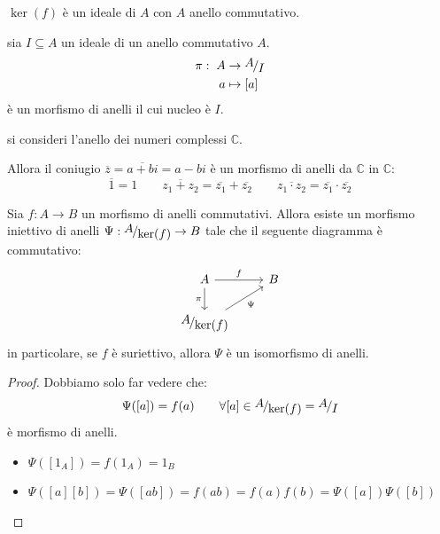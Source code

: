 \documentclass[../main.tex]{subfiles}
\begin{document}
\begin{remark}
    $\ker(f)$ è un ideale di $A$ con $A$ anello commutativo.
\end{remark}

\begin{example}
    sia $I \subseteq A$ un ideale di un anello commutativo $A$.
    \begin{align*}
        \pi: \; A & \rightarrow \nicefrac{A}{I} \\
        a         & \mapsto [a]
    \end{align*}
    è un morfismo di anelli il cui nucleo è $I$.
\end{example}

\begin{example}
    si consideri l'anello dei numeri complessi $\mathbb{C}$.

    Allora il coniugio $\overline{z} = \overline{a+bi} = a - bi$ è un morfismo di anelli da $\mathbb{C}$ in $\mathbb{C}$:
    \begin{equation*}
        \overline{1} = 1 \qquad \overline{z_1 + z_2} = \overline{z_1} + \overline{z_2} \qquad \overline{z_1 \cdot z_2} = \overline{z_1} \cdot \overline{z_2}
    \end{equation*}
\end{example}

\begin{theorem}
    Sia $f : A \rightarrow B$ un morfismo di anelli commutativi. Allora esiste un morfismo iniettivo di anelli $\Psi : \nicefrac{A}{\ker(f)} \rightarrow B$ tale che il seguente diagramma è commutativo:
    \begin{equation*}
        \begin{tikzcd}
            A \arrow{r}{f} \arrow[swap]{d}{\pi} & B \\
            \nicefrac{A}{\ker(f)} \arrow[swap]{ur}{\Psi}
        \end{tikzcd}
    \end{equation*}
    in particolare, se $f$ è suriettivo, allora $\Psi$ è un isomorfismo di anelli.
\end{theorem}
\begin{proof}
    Dobbiamo solo far vedere che:
    \[
        \Psi([a]) = f(a) \qquad \forall [a] \in \nicefrac{A}{\ker(f)} = \nicefrac{A}{I}
    \]
    è morfismo di anelli.
    \begin{itemize}
        \item $\Psi([1_A]) = f(1_A) = 1_B$
        \item $\Psi([a][b]) = \Psi([ab]) = f(ab) = f(a)f(b) = \Psi([a])\Psi([b])$
    \end{itemize}
\end{proof}
\end{document}
